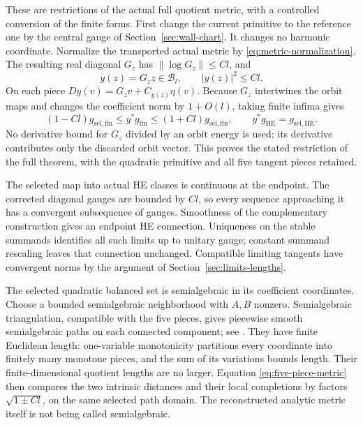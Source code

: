 \documentclass[11pt]{amsart}
\theoremstyle{definition}
\theoremstyle{remark}
\newcommand{\cB}{\mathcal B}
\begin{document}
These are restrictions of the actual full quotient metric, with a
controlled conversion of the finite forms. First change the current
primitive to the reference one by the central gauge of
Section~\ref{sec:wall-chart}. It changes no harmonic coordinate.
Normalize the transported actual metric by
\eqref{eq:metric-normalization}. The resulting real diagonal $G_z$
has $\|\log G_z\|\le Cl$, and
\[
 y(z)=G_z z\in\cB_l,\qquad |y(z)|^2\le Cl.
\]
On each piece $Dy(v)=G_zv+C_{y(z)}\eta(v)$.
Because $G_z$ intertwines the orbit maps and changes the coefficient
norm by $1+O(l)$, taking finite infima gives
\[
 (1-Cl)g_{\mathrm{sel},\mathrm{fin}}
   \le y^*g_{\mathrm{fin}}\le(1+Cl)g_{\mathrm{sel},\mathrm{fin}},
 \qquad y^*g_{\mathrm{HE}}=g_{\mathrm{sel},\mathrm{HE}}.
\]
No derivative bound for $G_z$ divided by an orbit energy is used;
its derivative contributes only the discarded orbit vector.
This proves the stated restriction of the full theorem, with the
quadratic primitive and all five tangent pieces retained.

The selected map into actual HE classes is continuous at the endpoint.
The corrected diagonal gauges are bounded by $Cl$, so every sequence
approaching it has a convergent subsequence of gauges. Smoothness of
the complementary construction gives an endpoint HE connection.
Uniqueness on the stable summands identifies all such limits up to
unitary gauge; constant summand rescaling leaves that connection
unchanged. Compatible limiting tangents have convergent norms by the
argument of Section~\ref{sec:limits-lengths}.

The selected quadratic balanced set is semialgebraic in its coefficient
coordinates. Choose a bounded semialgebraic neighborhood with $A,B$
nonzero. Semialgebraic triangulation, compatible with the five pieces,
gives piecewise smooth semialgebraic paths on each connected component;
see \cite[Proposition~1.6, Theorem~1.10 and Proposition~1.13]{Coste05}.
They have finite Euclidean length: one-variable monotonicity
\cite[Theorem~2.1]{Coste99} partitions every coordinate into finitely
many monotone pieces, and the sum of its variations bounds length.
Their finite-dimensional quotient lengths are no larger. Equation
\eqref{eq:five-piece-metric} then compares the two intrinsic distances
and their local completions by factors $\sqrt{1\pm Cl}$, on the same
selected path domain. The reconstructed analytic metric itself is not
being called semialgebraic.
\end{document}
